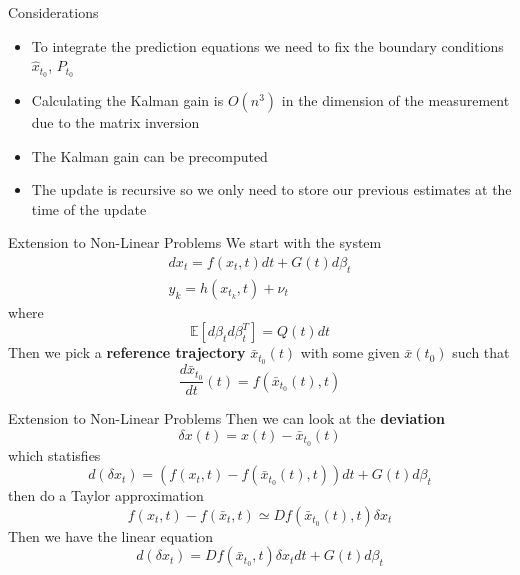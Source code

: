 \documentclass{beamer}
\begin{document}
\begin{frame}{Considerations}
  \begin{itemize}
   \pause
\item To integrate the prediction equations we need to fix the boundary
  conditions $\hat{x}_{t_0}$, $P_{t_0}$
   \pause
  \item Calculating the Kalman gain is $O(n^3)$ in the dimension of the
    measurement due to the matrix inversion
    \pause
  \item The Kalman gain can be precomputed
    \pause 
\item The update is recursive so we only need to store our previous estimates at
  the time of the update
 
  \end{itemize}

\end{frame}
 
\begin{frame}{Extension to Non-Linear Problems}
  We start with the system
  \begin{align}
    dx_t = f(x_t,t)dt + G(t)d\beta_t \\
    y_k = h(x_{t_k}, t) + \nu_t
  \end{align}
  where
  \begin{equation}
    \mathbb{E}[d\beta_td\beta^T_t] = Q(t) dt
  \end{equation}
  \pause
  Then we pick a \textbf{reference trajectory} $\bar{x}_{t_0}(t)$ with some given
  $\bar{x}(t_0)$ such that
  \begin{equation}
    \frac{d\bar{x}_{t_0}}{dt}(t) = f(\bar{x}_{t_0}(t),t)
  \end{equation}
\end{frame}

\begin{frame}{Extension to Non-Linear Problems}
  Then we can look at the \textbf{deviation}
  \begin{equation}
    \delta x(t) = x(t) - \bar{x}_{t_0}(t) 
  \end{equation}
  which statisfies
  \pause
  \begin{equation}
    d(\delta x_t) = (f(x_t,t) - f(\bar{x}_{t_0}(t),t)) dt + G(t) d\beta_t
  \end{equation}
  \pause
  then do a Taylor approximation
  \begin{equation}
    f(x_t,t) - f(\bar{x}_t,t) \simeq Df(\bar{x}_{t_0}(t),t)  \delta x_t 
  \end{equation}
  \pause
  Then we have the linear equation
  \begin{equation}
    d(\delta x_t) = Df(\bar{x}_{t_0} , t) \delta x_t dt + G(t) d\beta_t
  \end{equation}
\end{frame}
\end{document}
